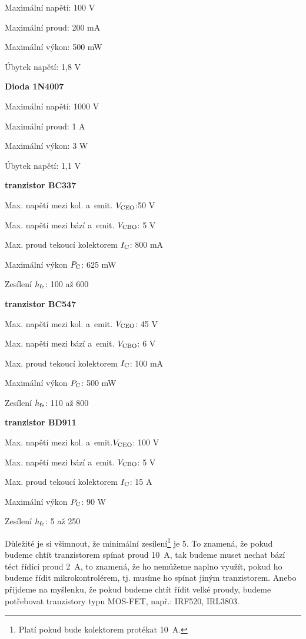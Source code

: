 Maximální napětí: 100 V

Maximální proud: 200 mA

Maximální výkon:  500 mW

Úbytek napětí: 1,8 V

\vskip 2mm

\hypertarget{1N4007}{}
{\bf Dioda 1N4007} 

Maximální napětí: 1000 V

Maximální proud: 1 A

Maximální výkon: 3 W

Úbytek napětí: 1,1 V

\vskip 2mm

\hypertarget{BCC337}{}
{\bf tranzistor BC337} 

Max. napětí mezi kol. a~emit. $V \rm _{CEO}$:50 V

Max. napětí mezi bází a~emit. $V \rm _{CBO}$: 5 V

Max. proud tekoucí kolektorem $I \rm _C$: 800 mA

Maximální výkon $ P \rm _C$: 625 mW

Zesílení $ h \rm _{fe}$: 100 až 600

\vskip 2mm

\hypertarget{BCC547}{}
{\bf tranzistor BC547} 

Max. napětí mezi kol. a~emit. $ V \rm_{CEO}$: 45 V

Max. napětí mezi bází a~emit. $ V \rm _{CBO}$: 6 V

Max. proud tekoucí kolektorem $ I \rm _C$: 100 mA

Maximální výkon $P \rm _C$: 500 mW

Zesílení $h \rm _{fe}$: 110 až 800

\vskip 2mm

\hypertarget{BD911}{}
{\bf tranzistor BD911}  

Max. napětí mezi kol. a~emit.$V \rm _{CEO}$: 100 V

Max. napětí mezi bází a~emit. $V \rm _{CBO}$: 5 V

Max. proud tekoucí kolektorem $I \rm _C$: 15 A

Maximální výkon $P \rm _C$: 90 W

Zesílení $h \rm _{fe}$: 5 až 250

Důležité je si všimnout, že minimální zesílení\footnote{Platí pokud bude kolektorem protékat 10~A.}  je 5. 
To znamená, že pokud budeme chtít tranzistorem spínat proud 10~A, tak budeme muset nechat bází téct řídící proud 2~A,
to znamená, že ho nemůžeme naplno využít, pokud ho budeme řídit mikrokontrolérem, tj. musíme ho spínat jiným tranzistorem. 
Anebo přijdeme na myšlenku, že pokud budeme chtít řídit velké proudy, budeme potřebovat tranzistory typu MOS-FET, např.: IRF520, IRL3803.


